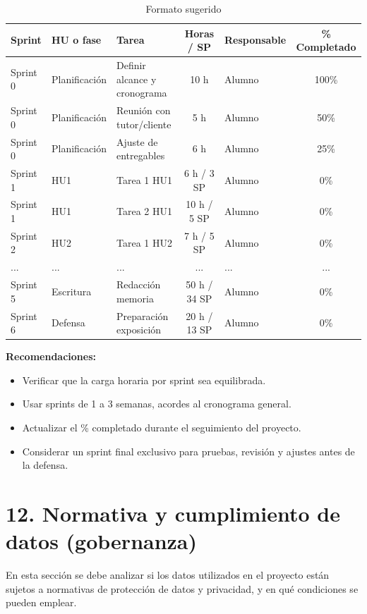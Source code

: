 \documentclass[
11pt, %
]{charter}
\begin{document}
\begin{table}[htpb]
\centering
\caption{Formato sugerido}
\begin{tabularx}{\linewidth}{@{}|l|l|X|c|l|c|@{}}
\hline
\rowcolor[HTML]{C0C0C0}
Sprint & HU o fase & Tarea & Horas / SP & Responsable & \% Completado \\ \hline
Sprint 0 & Planificación & Definir alcance y cronograma & 10 h & Alumno & 100\% \\ \hline
Sprint 0 & Planificación & Reunión con tutor/cliente & 5 h & Alumno & 50\% \\ \hline
Sprint 0 & Planificación & Ajuste de entregables & 6 h & Alumno & 25\% \\ \hline
Sprint 1 & HU1 & Tarea 1 HU1 & 6 h / 3 SP & Alumno & 0\% \\ \hline
Sprint 1 & HU1 & Tarea 2 HU1 & 10 h / 5 SP & Alumno & 0\% \\ \hline
Sprint 2 & HU2 & Tarea 1 HU2 & 7 h / 5 SP & Alumno & 0\% \\ \hline
... & ... & ... & ... & ... & ... \\ \hline
Sprint 5 & Escritura & Redacción memoria & 50 h / 34 SP & Alumno & 0\% \\ \hline
Sprint 6 & Defensa & Preparación exposición & 20 h / 13 SP & Alumno & 0\% \\ \hline
\end{tabularx}
\end{table}

\textbf{Recomendaciones:}
\begin{itemize}
  \item Verificar que la carga horaria por sprint sea equilibrada.
  \item Usar sprints de 1 a 3 semanas, acordes al cronograma general.
  \item Actualizar el \% completado durante el seguimiento del proyecto.
  \item Considerar un sprint final exclusivo para pruebas, revisión y ajustes antes de la defensa.
\end{itemize}


\section{12. Normativa y cumplimiento de datos (gobernanza)}

En esta sección se debe analizar si los datos utilizados en el proyecto están sujetos a normativas de protección de datos y privacidad, y en qué condiciones se pueden emplear.
\end{document}
